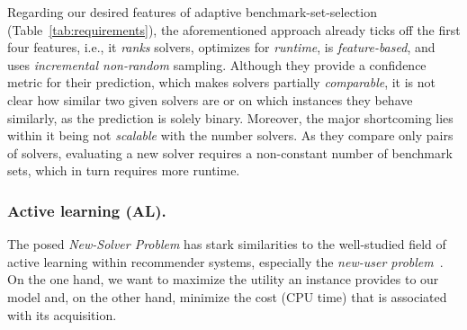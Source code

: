 \documentclass[runningheads]{llncs}
\begin{document}
Regarding our desired features of adaptive benchmark-set-selection (Table~\ref{tab:requirements}), the aforementioned approach already ticks off the first four features, i.e., it \emph{ranks} solvers, optimizes for \emph{runtime}, is \emph{feature-based}, and uses \emph{incremental non-random} sampling.
Although they provide a confidence metric for their prediction, which makes solvers partially \emph{comparable}, it is not clear how similar two given solvers are or on which instances they behave similarly, as the prediction is solely binary.
Moreover, the major shortcoming lies within it being not \emph{scalable} with the number solvers.
As they compare only pairs of solvers, evaluating a new solver requires a non-constant number of benchmark sets, which in turn requires more runtime.

\subsubsection{Active learning (AL).}
The posed \emph{New-Solver Problem} has stark similarities to the well-studied field of active learning within recommender systems, especially the \emph{new-user problem}~\cite{RubensESK15}.
On the one hand, we want to maximize the utility an instance provides to our model and, on the other hand, minimize the cost (CPU time) that is associated with its acquisition.
\end{document}
